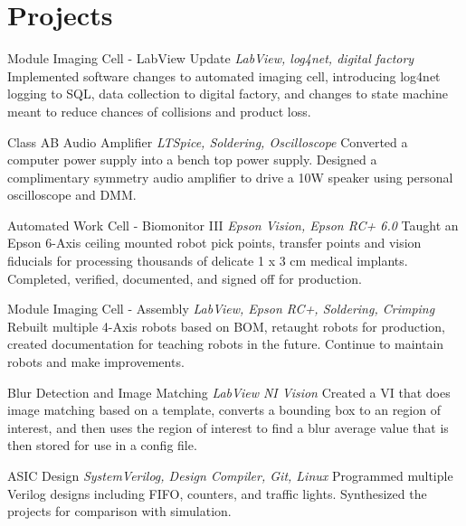 \documentclass[letterpaper]{moderncv}        %
\begin{document}
\section{Projects}
\cventry
{}
{Module Imaging Cell - LabView Update}
{}
{\textit{LabView, log4net, digital factory}}
{}
{Implemented software changes to automated imaging cell, introducing log4net logging to SQL, data collection to digital factory, and changes to state machine meant to reduce chances of collisions and product loss.\\}
\vspace{-1mm}	
	
\cventry
{}
{Class AB Audio Amplifier}
{}
{\textit{LTSpice, Soldering, Oscilloscope}}
{}
{Converted a computer power supply into a bench top power supply. Designed a complimentary symmetry audio amplifier to drive a 10W speaker using personal oscilloscope and DMM.\\}
\vspace{-1mm}	
	
\cventry
{}
{Automated Work Cell - Biomonitor III}
{}
{\textit{Epson Vision, Epson RC+ 6.0}}
{}
{Taught an Epson 6-Axis ceiling mounted robot pick points, transfer points and vision fiducials for processing thousands of delicate 1 x 3 cm medical implants.  Completed, verified, documented, and signed off for production.\\}
\vspace{-1mm}	
	
\cventry
{}
{Module Imaging Cell - Assembly}
{}
{\textit{LabView, Epson RC+, Soldering, Crimping}}
{}
{Rebuilt multiple 4-Axis robots based on BOM, retaught robots for production, created documentation for teaching robots in the future. Continue to maintain robots and make improvements.\\}
\vspace{-1mm}	
	
\cventry
{}
{Blur Detection and Image Matching}
{}
{\textit{LabView NI Vision}}
{}
{Created a VI that does image matching based on a template, converts a bounding box to an region of interest, and then uses the region of interest to find a blur average value that is then stored for use in a config file.  \\}
\vspace{-1mm}	

\cventry
{}
{ASIC Design}
{}
{\textit{SystemVerilog, Design Compiler, Git, Linux}}
{}
{Programmed multiple Verilog designs including FIFO, counters, and traffic lights.  Synthesized the projects for comparison with simulation.\\}
\vspace{-1mm}	
	
\end{document}

